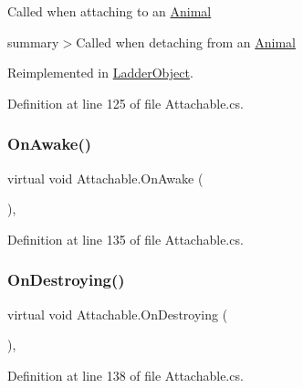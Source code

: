 Called when attaching to an \mbox{\hyperlink{class_animal}{Animal}}

summary$>$Called when detaching from an \mbox{\hyperlink{class_animal}{Animal}}

Reimplemented in \mbox{\hyperlink{class_ladder_object_ae0bd6ffec9b6cd52fa349df754d2f1fa}{Ladder\+Object}}.



Definition at line 125 of file Attachable.\+cs.

\mbox{\label{class_attachable_a10b95ee6da8ee9cb6b0fe1085abd7205}} 
\subsubsection{\texorpdfstring{On\+Awake()}{OnAwake()}}
{\footnotesize\ttfamily virtual void Attachable.\+On\+Awake (\begin{DoxyParamCaption}{ }\end{DoxyParamCaption})\hspace{0.3cm}{\ttfamily [protected]}, {\ttfamily [virtual]}}



Definition at line 135 of file Attachable.\+cs.

\mbox{\label{class_attachable_a948016df773dff01ee30da2c903e5495}} 
\subsubsection{\texorpdfstring{On\+Destroying()}{OnDestroying()}}
{\footnotesize\ttfamily virtual void Attachable.\+On\+Destroying (\begin{DoxyParamCaption}{ }\end{DoxyParamCaption})\hspace{0.3cm}{\ttfamily [protected]}, {\ttfamily [virtual]}}



Definition at line 138 of file Attachable.\+cs.

\mbox{\label{class_attachable_abe7cf9d7930393610c7c9c4ae14b12d7}} 
